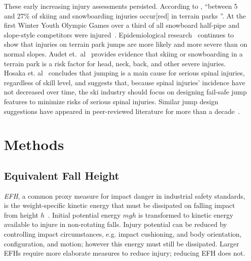 \documentclass{article}
\begin{document}
These early increasing injury assessments persisted. According to
\cite{Russell2014}, ``between 5 and 27\% of skiing and snowboarding injuries
occur[red] in terrain parks
\cite{Bridges2003,Goulet2007,Moffat2009,Greve2009,Brooks2010,Ruedl2013}''.
At the first Winter Youth Olympic Games over a third of all
snowboard half-pipe and slope-style competitors were injured~\cite{Ruedl2012}.
Epidemiological research~\cite{Carus2016,Audet2020,Hosaka2020} continues to
show that injuries on terrain park jumps are more likely and more severe than
on normal slopes. Audet et.~al~\cite{Audet2020} provides evidence that skiing
or snowboarding in a terrain park is a risk factor for head, neck, back, and
other severe injuries. Hosaka et. al~\cite{Hosaka2020} concludes that jumping
is a main cause for serious spinal injuries, regardless of skill level, and
suggests that, because spinal injuries' incidence  have not decreased over time,
the ski industry should focus on designing fail-safe jump features to minimize
risks of serious spinal injuries. Similar jump design suggestions have appeared in
peer-reviewed literature for more than a
decade~\cite{Hubbard2009,Swedberg2012,Hubbard2012,McNeil2012,McNeil2012a,Hubbard2015,Levy2015,Petrone2017,Moore2018}.

\section{Methods}
\subsection{Equivalent Fall Height}
\label{sec:efh}
%
\emph{EFH}, a common proxy measure for impact danger in industrial safety
standards, is the weight-specific kinetic energy that must be dissipated on
falling impact from height $h$~\cite{Muller1995,Hubbard2009,Gasser2018}.
Initial potential energy $mgh$ is transformed to kinetic energy available to
injure in non-rotating falls. Injury potential can be reduced by controlling
impact circumstances, e.g. impact cushioning, and body orientation,
configuration, and motion; however this energy must still be dissipated. Larger
EFHs require more elaborate measures to reduce injury; reducing EFH does not.
\end{document}
